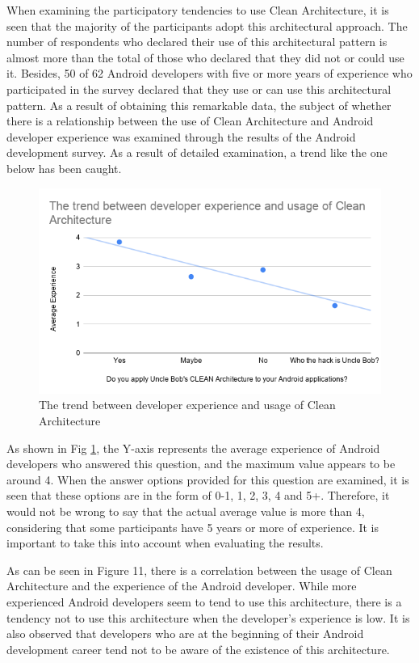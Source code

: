 When examining the participatory tendencies to use Clean Architecture, it is seen that the majority of the participants adopt this architectural approach. The number of respondents who declared their use of this architectural pattern is almost more than the total of those who declared that they did not or could use it. Besides, 50 of 62 Android developers with five or more years of experience who participated in the survey declared that they use or can use this architectural pattern. As a result of obtaining this remarkable data, the subject of whether there is a relationship between the use of Clean Architecture and Android developer experience was examined through the results of the Android development survey. As a result of detailed examination, a trend like the one below has been caught.
\begin{figure}[ht!]
    \centering
    \includegraphics[scale=0.7]{figures/survey_q4_clean_arch_trend.png}
    \caption{The trend between developer experience and usage of Clean Architecture}
    \label{fig:survey_q4_clean_arch_trend}
\end{figure}
\FloatBarrier

As shown in Fig \ref{fig:survey_q4_clean_arch_trend}, the Y-axis represents the average experience of Android developers who answered this question, and the maximum value appears to be around 4. When the answer options provided for this question are examined, it is seen that these options are in the form of 0-1, 1, 2, 3, 4 and 5+. Therefore, it would not be wrong to say that the actual average value is more than 4, considering that some participants have 5 years or more of experience. It is important to take this into account when evaluating the results.

As can be seen in Figure 11, there is a correlation between the usage of Clean Architecture and the experience of the Android developer. While more experienced Android developers seem to tend to use this architecture, there is a tendency not to use this architecture when the developer's experience is low. It is also observed that developers who are at the beginning of their Android development career tend not to be aware of the existence of this architecture.